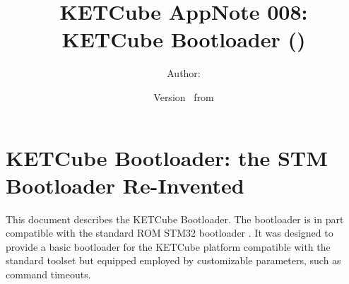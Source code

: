   




\title{\UWBLogo KETCube AppNote 008:\\ KETCube Bootloader (\vhCurrentVersion)}

\author{Author: \vhListAllAuthorsLongWithAbbrev}
\date{Version \vhCurrentVersion\ from \vhCurrentDate}

  




  


\section*{KETCube Bootloader: the STM Bootloader Re-Invented}


This document describes the KETCube Bootloader. The bootloader is in part compatible with the standard ROM STM32 bootloader \cite{STM32:AN3155}. It was designed to provide a basic bootloader for the KETCube platform compatible with the standard toolset but equipped employed by customizable parameters, such as command timeouts.

\setcounter{tocdepth}{2}
\tableofcontents
\clearpage

\listoffigures
\listoftables
\begin{versionhistory}
\end{versionhistory}
\setcounter{table}{0}


